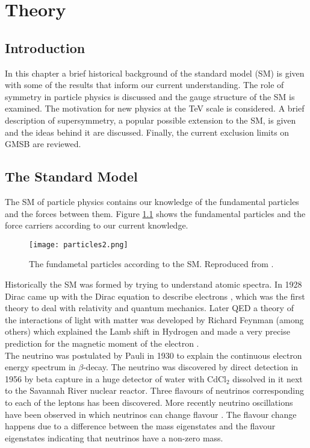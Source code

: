 \chapter{Theory}

\section{Introduction}

In this chapter a brief historical background of the standard model (SM) is 
given with some of the results that inform our current understanding. The role 
of symmetry in particle physics is discussed and the gauge structure of the
SM is examined. The motivation for new physics at the TeV scale is
considered. A brief description of supersymmetry, a popular possible extension 
to the SM, is given and the ideas behind it are discussed. Finally,
the current exclusion limits on GMSB are reviewed. 

\section{The Standard Model}

The SM of particle physics \cite{halzen_and_martin, perkins, 
grifiths} contains our knowledge of the fundamental particles and the forces 
between them. Figure \ref{fig:particles} shows the fundamental particles and the 
force carriers according to our current knowledge. \\

\begin{figure}
\begin{center}
\texttt{[image: particles2.png]}
\end{center}
\caption{The fundametal particles according to the SM. Reproduced
from \cite{particles}.}
\label{fig:particles}
\end{figure}

Historically the SM was formed by trying to understand atomic
spectra. In 1928 Dirac came up with the Dirac equation to describe electrons
\cite{dirac}, which was the first theory to deal with relativity and quantum 
mechanics. Later QED a theory of the interactions of light with matter was 
developed by Richard Feynman (among others) \cite{qed} which explained the Lamb 
shift in Hydrogen \cite{lamb} and made a very precise prediction for the 
magnetic moment of the electron \cite{emagmom}. \\

The neutrino was postulated by Pauli in 1930 \cite{pauli} to explain the 
continuous electron energy spectrum in $\beta$-decay. The neutrino was 
discovered by direct detection in 1956 \cite{neutrino} by beta capture in a 
huge detector of water with CdCl$_{2}$ dissolved in it next to the Savannah 
River nuclear reactor. Three flavours of neutrinos corresponding to each of the 
leptons has been discovered. More recently neutrino oscillations have been 
observed in which neutrinos can change flavour \cite{oscillations}. The 
flavour change happens due to a difference between the mass eigenstates and the 
flavour eigenstates indicating that neutrinos have a non-zero mass. \\

